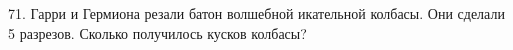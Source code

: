 71. Гарри и Гермиона резали батон волшебной икательной колбасы. Они сделали 5 разрезов. Сколько получилось кусков колбасы?\\
